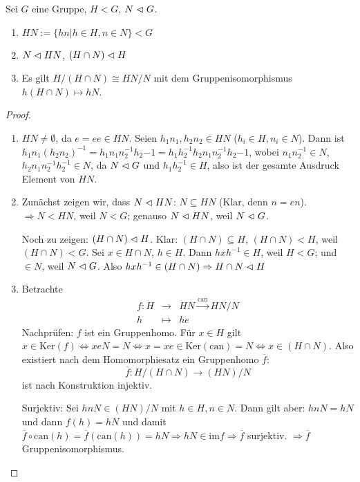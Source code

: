 \documentclass[12pt,a4paper]{scrartcl}
\begin{document}
\begin{satz}[1. Isomorphiesatz]
	Sei $G$ eine Gruppe, $H<G$, $N\vartriangleleft G$.\begin{enumerate}
		\item $HN:=\{hn|h\in H, n\in N\}<G$
		\item $N\vartriangleleft HN$, $(H\cap N)\vartriangleleft H$
		\item Es gilt $H/(H\cap N) \cong HN/N$ mit dem Gruppenisomorphismus $h(H\cap N)\mapsto hN$.
	\end{enumerate}
\end{satz}	
\begin{proof}
	\leavevmode
	\begin{enumerate}
		\item $HN\neq \emptyset$, da $e = ee\in HN$. Seien $h_1n_1,h_2n_2\in HN$ ($h_i\in H, n_i\in N$). Dann ist $h_1n_1(h_2n_2)^{-1} = h_1n_1n_2^{-1}h_2{-1} = h_1h_2^{-1}h_2n_1n_2^{-1}h_2{-1}$, wobei $n_1n_2^{-1}\in N$, $h_2n_1n_2^{-1}h_2^{-1}\in N$, da $N\vartriangleleft G$ und $h_1h_2^{-1}\in H$, also ist der gesamte Ausdruck Element von $HN$.
		\item Zunächst zeigen wir, dass $N\vartriangleleft HN$: $N\subseteq HN$ (Klar, denn $n = en$). $\Rightarrow N<HN$, weil $N<G$; genauso $N\vartriangleleft HN$, weil $N\vartriangleleft G$.
		
		Noch zu zeigen: $(H\cap N)\vartriangleleft H$. Klar: $(H\cap N)\subseteq H$, $(H\cap N)<H$, weil $(H\cap N)<G$. Sei $x\in H\cap N$, $h\in H$. Dann $hxh^{-1}\in H$, weil $H<G$; und $\in N$, weil $N\vartriangleleft G$. Also $hxh^{-1}\in (H\cap N) \Rightarrow H\cap N\vartriangleleft H$
		\item Betrachte 
		\begin{eqnarray*}
			f\colon H&\to& HN \xrightarrow{\mbox{can}} HN/N\\
			h&\mapsto &he
		\end{eqnarray*}
		Nachprüfen: $f$ ist ein Gruppenhomo. Für $x\in H$ gilt $x\in \mbox{Ker}(f)\Leftrightarrow xeN = N\Leftrightarrow x = xe\in \mbox{Ker}(\mbox{can}) = N\Leftrightarrow x\in (H\cap N)$. Also existiert nach dem Homomorphiesatz ein Gruppenhomo $\overline{f}$:
		$$\overline{f}\colon H/(H\cap N)\to (HN)/N$$ ist nach Konstruktion injektiv.
		
		Surjektiv: Sei $hnN\in (HN)/N$ mit $h\in H, n\in N$. Dann gilt aber: $hnN = hN$ und dann $f(h)=hN$ und damit $\overline{f}\circ\mbox{can}(h) = \overline{f}(\mbox{can}(h)) = hN\Rightarrow hN\in \mbox{im}f\Rightarrow \overline{f}$ surjektiv. $\Rightarrow \overline{f}$ Gruppenisomorphismus.
	\end{enumerate}
\end{proof}
\end{document}
